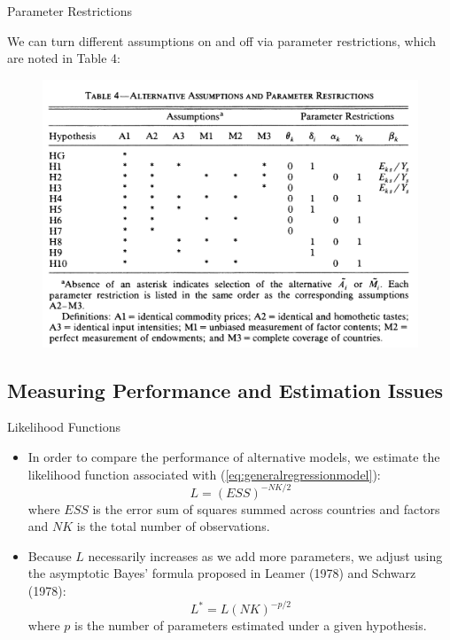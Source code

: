 \documentclass[aspectratio=169]{beamer}
\begin{document}

\begin{frame}{Parameter Restrictions}

We can turn different assumptions on and off via parameter restrictions, which are noted in Table 4:

\begin{figure}
    \centering
    \includegraphics[scale = 0.75]{Table 4.png}
    \label{fig:Table4}
\end{figure} 
    
\end{frame}


\subsection{Measuring Performance and Estimation Issues}


\begin{frame}{Likelihood Functions}

\begin{itemize}
    \item<1-> In order to compare the performance of alternative models, we estimate the likelihood function associated with (\ref{eq:generalregressionmodel}):
    \begin{equation*}
        L = \left( ESS \right)^{-NK / 2}
    \end{equation*}
    where $ ESS $ is the error sum of squares summed across countries and factors and $ NK $ is the total number of observations.
    \item<2-> Because $ L $ necessarily increases as we add more parameters, we adjust using the asymptotic Bayes’ formula proposed in Leamer (1978) and Schwarz (1978):
    \begin{equation*}
        L^{*} = L\left( NK \right)^{-p / 2}
    \end{equation*}
    where $ p $ is the number of parameters estimated under a given hypothesis.
\end{itemize}
    
\end{frame}
\end{document}

